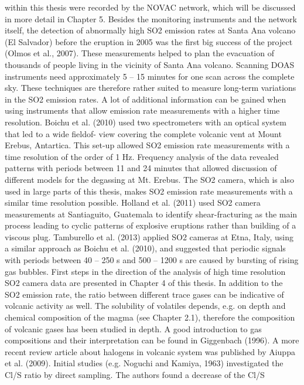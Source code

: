 \documentclass  [
  paper    = a4,
  BCOR     = 10mm,
  twoside,
  fontsize = 12pt,
  fleqn,
  toc      = bibnumbered,
  toc      = listofnumbered,
  numbers  = noendperiod,
  headings = normal,
  listof   = leveldown,
  version  = 3.03
]                                       {scrreprt}
\begin{document}
	within this thesis were recorded by the NOVAC network, which will be discussed
	in more detail in Chapter 5. Besides the monitoring instruments and the network
	itself, the detection of abnormally high SO2 emission rates at Santa Ana volcano
	(El Salvador) before the eruption in 2005 was the first big success of the project
	(Olmos et al., 2007). These measurements helped to plan the evacuation of
	thousands of people living in the vicinity of Santa Ana volcano. Scanning DOAS
	instruments need approximately 5 – 15 minutes for one scan across the complete
	sky. These techniques are therefore rather suited to measure long-term variations
	in the SO2 emission rates.
	A lot of additional information can be gained when using instruments that
	allow emission rate measurements with a higher time resolution. Boichu et al.
	(2010) used two spectrometers with an optical system that led to a wide fieldof-
	view covering the complete volcanic vent at Mount Erebus, Antartica. This
	set-up allowed SO2 emission rate measurements with a time resolution of the
	order of 1 Hz. Frequency analysis of the data revealed patterns with periods
	between 11 and 24 minutes that allowed discussion of different models for the
	degassing at Mt. Erebus. The SO2 camera, which is also used in large parts of
	this thesis, makes SO2 emission rate measurements with a similar time resolution
	possible. Holland et al. (2011) used SO2 camera measurements at Santiaguito,
	Guatemala to identify shear-fracturing as the main process leading to cyclic
	patterns of explosive eruptions rather than building of a viscous plug. Tamburello
	et al. (2013) applied SO2 cameras at Etna, Italy, using a similar approach as
	Boichu et al. (2010), and suggested that periodic signals with periods between
	40 – 250 s and 500 – 1200 s are caused by bursting of rising gas bubbles. First
	steps in the direction of the analysis of high time resolution SO2 camera data
	are presented in Chapter 4 of this thesis.
	In addition to the SO2 emission rate, the ratio between different trace gases can
	be indicative of volcanic activity as well. The solubility of volatiles depends, e.g.
	on depth and chemical composition of the magma (see Chapter 2.1), therefore
	the composition of volcanic gases has been studied in depth. A good introduction
	to gas compositions and their interpretation can be found in Giggenbach (1996).
	A more recent review article about halogens in volcanic system was published by
	Aiuppa et al. (2009). Initial studies (e.g. Noguchi and Kamiya, 1963) investigated
	the Cl/S ratio by direct sampling. The authors found a decrease of the Cl/S
\end{document}

